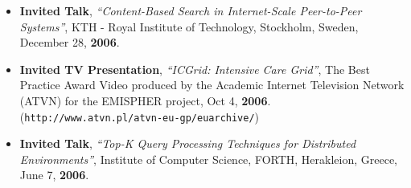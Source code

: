 \documentclass[10pt]{article}
\begin{document}
\begin{itemize}

\item  {\bf Invited Talk}, {\em ``Content-Based Search in Internet-Scale Peer-to-Peer Systems''}, KTH - Royal Institute of Technology, Stockholm, Sweden, December 28, {\bf 2006}.
\item  {\bf Invited TV Presentation},  {\em ``ICGrid: Intensive Care Grid''}, 
The Best Practice Award Video produced by the Academic Internet Television Network (ATVN)
for the EMISPHER project, Oct 4, {\bf 2006}. \\
({\tt http://www.atvn.pl/atvn-eu-gp/euarchive/})
\item  {\bf Invited Talk}, {\em ``Top-K Query Processing Techniques for Distributed Environments''}, Institute of Computer Science, FORTH, Herakleion, Greece, June 7, {\bf 2006}. 
\end{itemize}
\end{document}
